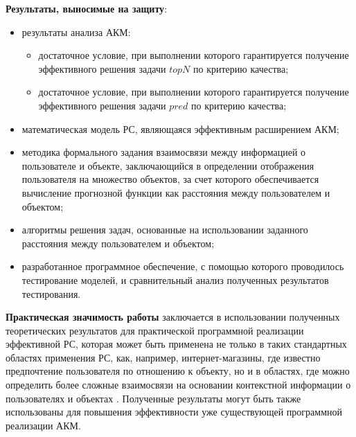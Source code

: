 {\bf Результаты, выносимые на защиту}:
\begin{itemize}
\item результаты анализа АКМ:
  \begin{itemize}
	\item достаточное условие, при выполнении которого гарантируется получение
		эффективного решения задачи $topN$ по критерию качества;
	\item достаточное условие, при выполнении которого гарантируется получение
		эффективного решения задачи $pred$ по критерию качества;
  \end{itemize}
\item математическая модель РС, являющаяся эффективным расширением АКМ;
\item методика формального задания взаимосвязи между информацией
	о пользователе и объекте,
	заключающийся в определении отображения пользователя на множество объектов,
	за счет которого обеспечивается вычисление прогнозной функции как
	расстояния между пользователем и объектом;
\item алгоритмы решения задач, основанные на использовании заданного
	расстояния между пользователем и объектом;
\item разработанное программное обеспечение, с помощью которого проводилось
	тестирование моделей, и сравнительный анализ полученных
	результатов тестирования.
\end{itemize}


{\bf Практическая значимость работы} заключается в использовании
полученных теоретических результатов для практической программной реализации
эффективной РС, которая может быть применена не только в таких стандартных
областях применения РС, как, например, интернет-магазины,
где известно предпочтение пользователя по отношению к объекту, но и
в областях, где можно определить более сложные взаимосвязи на основании
контекстной информации о пользователях и объектах \cite{2d}.
Полученные результаты могут быть также использованы для повышения
эффективности уже существующей программной реализации АКМ.

